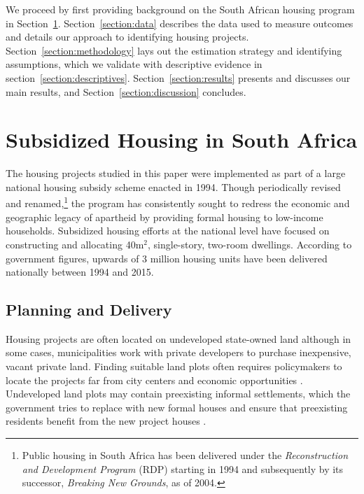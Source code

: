\documentclass[12pt]{article}
\begin{document}
We proceed by first providing background on the South African housing program in Section~\ref{section:background}. 
Section~\ref{section:data} describes the data used to measure outcomes and details our approach to identifying housing projects. Section~\ref{section:methodology} lays out the estimation strategy and identifying assumptions, which we validate with descriptive evidence in section~\ref{section:descriptives}. Section~\ref{section:results} presents and discusses our main results, and  Section~\ref{section:discussion} concludes.


\section{Subsidized Housing in South Africa} \label{section:background}

The housing projects studied in this paper were implemented as part of a large national housing subsidy scheme enacted in 1994. Though periodically revised and renamed,\footnote{Public housing in South Africa has been delivered under the {\it Reconstruction and Development Program} (RDP) starting in 1994 and subsequently by its successor, {\it Breaking New Grounds}, as of 2004.} the program has consistently sought to redress the economic and geographic legacy of apartheid by providing formal housing to low-income households. Subsidized housing efforts at the national level have focused on constructing and allocating 40m$^2$, single-story, two-room dwellings. According to government figures, upwards of 3 million housing units have been delivered nationally between 1994 and 2015.

\subsection{Planning and Delivery}

Housing projects are often located on undeveloped state-owned land although in some cases, municipalities work with private developers to purchase inexpensive, vacant private land.  Finding suitable land plots often requires policymakers to locate the projects far from city centers and economic opportunities \citep{dhsreports}.  Undeveloped land plots may contain preexisting informal settlements, which the government tries to replace with new formal houses and ensure that preexisting residents benefit from the new project houses \citep{serihistory}.
\end{document}
